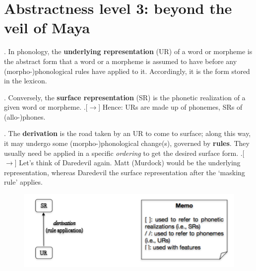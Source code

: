 \documentclass[11pt, oneside]{article}   	%
\begin{document}
\newpage

\section{Abstractness level 3: beyond the veil of Maya}

\ex. In phonology, the {\bfseries underlying representation} (UR) of a word or morpheme is the abstract form that a word or a morpheme is assumed to have before any (morpho-)phonological rules have applied to it. Accordingly, it is the form stored in the lexicon.

\ex. Conversely, the {\bfseries surface representation} (SR) is the phonetic realization of a given word or morpheme.
	\a.[$\rightarrow$] Hence: URs are made up of phonemes, SRs of (allo-)phones.

\ex. The {\bfseries derivation} is the road taken by an UR to come to surface; along this way, it may undergo some (morpho-)phonological change(s), governed by {\bfseries rules}. They usually need be applied in a specific {\itshape ordering} to get the desired surface form.
	\a.[$\rightarrow$] Let's think of Daredevil again. Matt (Murdock) would be the underlying representation, whereas Daredevil the surface representation after the `masking rule' applies.

\begin{figure}[H]
\centering
\includegraphics[scale=0.75]{phonoprocess}
\end{figure}
\end{document}

